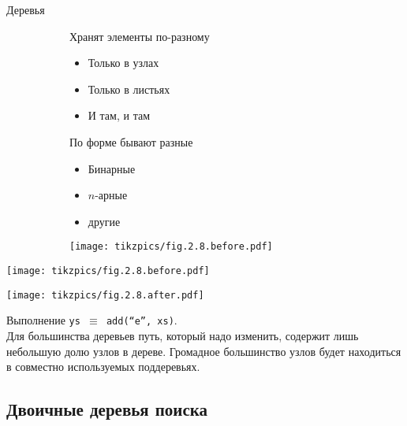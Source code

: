 \begin{frame}{Деревья}
\begin{figure}[ht]
\begin{subfigure}{.49\textwidth}
Хранят элементы по-разному
\begin{itemize}
\item Только в узлах
\item Только в листьях
\item И там, и там
\end{itemize}
\vspace{1em}
По форме бывают разные
\begin{itemize}
\item Бинарные
\item $n$-арные
\item другие
\end{itemize}
\end{subfigure}
\begin{subfigure}{.49\textwidth}
\texttt{[image: tikzpics/fig.2.8.before.pdf]}\par
\end{subfigure}
\end{figure}
\end{frame}


\begin{frame}
\begin{minipage}{\textwidth}
\begin{minipage}[t]{.48\textwidth}\vspace{0em}
  \texttt{[image: tikzpics/fig.2.8.before.pdf]}\par
\end{minipage}
\begin{minipage}[t]{.48\textwidth}\vspace{0em}
  \texttt{[image: tikzpics/fig.2.8.after.pdf]}\par
\end{minipage}
\end{minipage}
Выполнение \texttt{ys $\equiv$ add(``e'', xs)}.\\

Для большинства деревьев путь, который надо изменить, содержит лишь небольшую долю узлов в дереве. Громадное
большинство узлов будет находиться в совместно используемых поддеревьях.
\end{frame}

\subsection{Двоичные деревья поиска}

